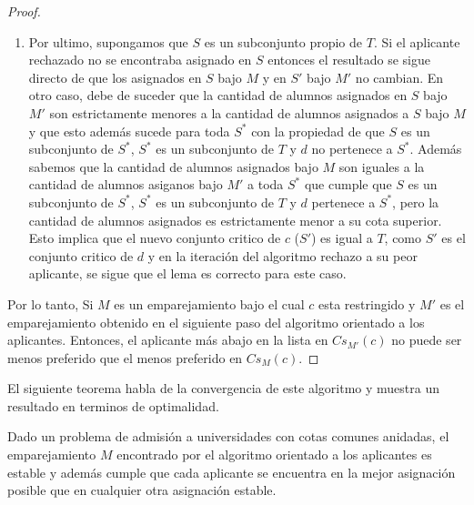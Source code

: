 \begin{proof}
\begin{enumerate}
\item Por ultimo, supongamos que $S$ es un subconjunto propio de $T$. Si el aplicante rechazado no se encontraba asignado en $S$ entonces el resultado se sigue directo de que los asignados en $S$ bajo $M$ y en $S'$ bajo $M'$ no cambian. En otro caso, debe de suceder que la cantidad de alumnos asignados en $S$ bajo $M'$ son estrictamente menores a la cantidad de alumnos asignados a $S$ bajo $M$ y que esto además sucede para toda $S^*$ con la propiedad de que $S$ es un subconjunto de $S^*$, $S^*$ es un subconjunto de $T$ y $d$ no pertenece a $S^*$. Además sabemos que la cantidad de alumnos asignados bajo $M$ son iguales a la cantidad de alumnos asiganos bajo $M'$ a toda $S^*$ que cumple que $S$ es un subconjunto de $S^*$, $S^*$ es un subconjunto de $T$ y $d$ pertenece a $S^*$, pero la cantidad de alumnos asignados es estrictamente menor a su cota superior.  Esto implica que el nuevo conjunto critico de $c$ ($S'$) es igual a $T$, como $S'$ es el conjunto critico de $d$ y en la iteración del algoritmo rechazo a su peor aplicante, se sigue que el lema es correcto para este caso. 
\end{enumerate}
Por lo tanto, Si $M$ es un emparejamiento bajo el cual $c$ esta restringido y $M'$ es el emparejamiento obtenido en el siguiente paso del algoritmo orientado a los aplicantes. Entonces, el aplicante más abajo en la lista en  $Cs_{M'}(c)$ no puede ser menos preferido que el menos preferido en $Cs_M(c)$.
\end{proof}

El siguiente teorema habla de la convergencia de este algoritmo y muestra un resultado en terminos de optimalidad.

\begin{teo}
Dado un problema de admisión a universidades con cotas comunes anidadas, el emparejamiento $M$ encontrado por el algoritmo orientado a los aplicantes es estable y además cumple que cada aplicante se encuentra en la mejor asignación posible que en cualquier otra asignación estable.
\end{teo}

